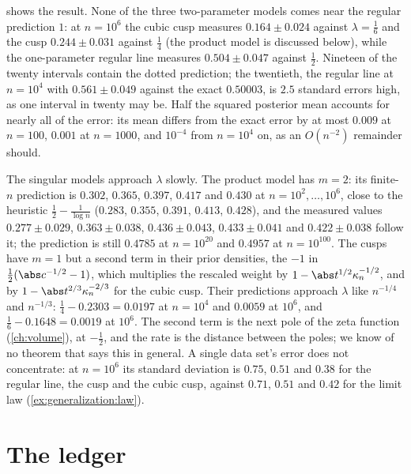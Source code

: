 \begin{refsection}
 shows the result. None of the three two-parameter models comes near the regular prediction $1$: at $n=10^6$ the cubic cusp measures $0.164\pm0.024$ against $\lambda=\frac16$ and the cusp $0.244\pm0.031$ against $\frac14$ (the product model is discussed below), while the one-parameter regular line measures $0.504\pm0.047$ against $\frac12$. Nineteen of the twenty intervals contain the dotted prediction; the twentieth, the regular line at $n=10^4$ with $0.561\pm0.049$ against the exact $0.50003$, is $2.5$ standard errors high, as one interval in twenty may be. Half the squared posterior mean accounts for nearly all of the error: its mean differs from the exact error by at most $0.009$ at $n=100$, $0.001$ at $n=1000$, and $10^{-4}$ from $n=10^4$ on, as an $O(n^{-2})$ remainder should.

The singular models approach $\lambda$ slowly. The product model has $m=2$: its finite-$n$ prediction is $0.302$, $0.365$, $0.397$, $0.417$ and $0.430$ at $n=10^2,\dots,10^6$, close to the heuristic $\frac12-\frac1{\log n}$ ($0.283$, $0.355$, $0.391$, $0.413$, $0.428$), and the measured values $0.277\pm0.029$, $0.363\pm0.038$, $0.436\pm0.043$, $0.433\pm0.041$ and $0.422\pm0.038$ follow it; the prediction is still $0.4785$ at $n=10^{20}$ and $0.4957$ at $n=10^{100}$. The cusps have $m=1$ but a second term in their prior densities, the $-1$ in $\frac12(\abs c^{-1/2}-1)$, which multiplies the rescaled weight by $1-\abs t^{1/2}\kappa_n^{-1/2}$, and by $1-\abs t^{2/3}\kappa_n^{-2/3}$ for the cubic cusp. Their predictions approach $\lambda$ like $n^{-1/4}$ and $n^{-1/3}$: $\frac14-0.2303=0.0197$ at $n=10^4$ and $0.0059$ at $10^6$, and $\frac16-0.1648=0.0019$ at $10^6$. The second term is the next pole of the zeta function (\cref{ch:volume}), at $-\frac12$, and the rate is the distance between the poles; we know of no theorem that says this in general. A single data set's error does not concentrate: at $n=10^6$ its standard deviation is $0.75$, $0.51$ and $0.38$ for the regular line, the cusp and the cubic cusp, against $0.71$, $0.51$ and $0.42$ for the limit law (\cref{ex:generalization:law}).

\section{The ledger}\label{sec:generalization:ledger}


\end{refsection}
